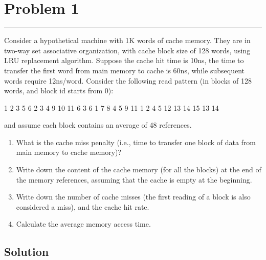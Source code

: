 \documentclass{article}
\begin{document}
\newcommand{\documentcourse}{COMP2120}
\newcommand{\documentnumber}{3}





\section*{Problem 1}
\hrule
\vspace{0.5cm}

Consider a hypothetical machine with 1K words of cache memory. They are in
two-way set associative organization, with cache block size of 128 words, using LRU replacement algorithm. Suppose the cache hit time is 10ns, the time to transfer the first word from main memory to cache is 60ns, while subsequent words require 12ns/word.
Consider the following read pattern (in blocks of 128 words, and block id starts from 0):

1 2 3 5 6 2 3 4 9 10 11 6 3 6 1 7 8 4 5 9 11 1 2 4 5 12 13 14 15 13 14

and assume each block contains an average of 48 references.

\begin{enumerate}[label=(\alph*)]
    \item What is the cache miss penalty (i.e., time to transfer one block of data from main memory to cache memory)?
    \item Write down the content of the cache memory (for all the blocks) at the end of the memory references, assuming that the cache is empty at the beginning.
    \item Write down the number of cache misses (the first reading of a block is also considered a miss), and the cache hit rate.
    \item Calculate the average memory access time.
\end{enumerate}

\subsection*{Solution}
\end{document}
